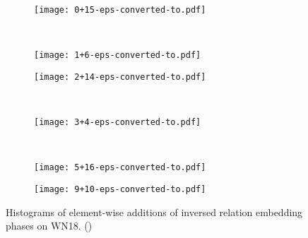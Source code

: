 \documentclass{article} \usepackage{iclr2019_conference,times}
\begin{document}
\begin{figure}
\centering
\begin{subfigure}{0.45\textwidth}
  \centering
  \texttt{[image: 0+15-eps-converted-to.pdf]}
  \caption{\\}
\end{subfigure}\begin{subfigure}{0.45\textwidth}
  \centering
  \texttt{[image: 1+6-eps-converted-to.pdf]}
  \caption{}
\end{subfigure}
\begin{subfigure}{0.45\textwidth}
  \centering
  \texttt{[image: 2+14-eps-converted-to.pdf]}
  \caption{\\}
\end{subfigure}
\begin{subfigure}{0.45\textwidth}
  \centering
  \texttt{[image: 3+4-eps-converted-to.pdf]}
  \caption{\\}
\end{subfigure}
\begin{subfigure}{0.45\textwidth}
  \centering
  \texttt{[image: 5+16-eps-converted-to.pdf]}
  \caption{}
\end{subfigure}
\begin{subfigure}{0.45\textwidth}
  \centering
  \texttt{[image: 9+10-eps-converted-to.pdf]}
  \caption{}
\end{subfigure}
\caption{Histograms of element-wise additions of inversed relation embedding phases on WN18. ()}
\label{fig:wn2}
\end{figure}
\end{document}
